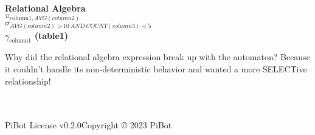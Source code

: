 \documentclass{article}
\date{}
\begin{document}
\begin{landscape}
\pagestyle{fancy}
\fancyhf{}
\renewcommand{\headrulewidth}{0pt}
\begin{flushleft}
\doublespacing
{\fontsize{14}{12}\selectfont
\textbf{\huge{Relational Algebra}}\newline \\
$\pi_{\text{column1},AVG(column2)}$
\\
\hspace{0.5em}$\sigma_{AVG(column2)>10\ AND \ COUNT(column3)<5}$
\\
\hspace{1.5em}$\gamma_{\text{column1}}$
\textbf{(table1)}
}
\end{flushleft}
\vfill
Why did the relational algebra expression break up with the automaton? Because it couldn't handle its non-deterministic behavior and wanted a more SELECTive relationship!
\\ \\ \\ 
\begin{center}
\parbox{\linewidth}{\raggedright PiBot License v0.2.0\hfill Copyright © 2023 PiBot}
\end{center}
\end{landscape}
\end{document}
